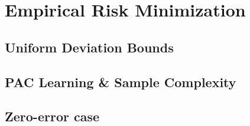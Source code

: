\newpage\section{Empirical Risk Minimization}

\subsection{Uniform Deviation Bounds}


\subsection{PAC Learning \& Sample Complexity}


\subsection{Zero-error case}